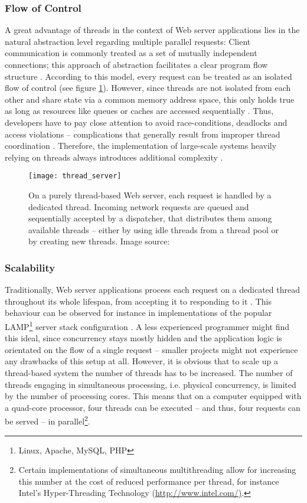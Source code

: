\subsubsection*{Flow of Control}
A great advantage of threads in the context of Web server applications lies in the natural abstraction level regarding multiple parallel requests: Client communication is commonly treated as a set of mutually independent connections; this approach of abstraction facilitates a clear program flow structure \cite{Veal2007}. According to this model, every request can be treated as an isolated flow of control (see figure \ref{fig:thread_server}). However, since threads are not isolated from each other and share state via a common memory address space, this only holds true as long as resources like queues or caches are accessed sequentially \cite[p. 2]{Behren2003}. Thus, developers have to pay close attention to avoid race-conditions, deadlocks and access violations -- complications that generally result from improper thread coordination \cite[p. 1]{Fischer2007}. Therefore, the implementation of large-scale systems heavily relying on threads always introduces additional complexity \cite[p. 1]{Lee2006}.

\begin{figure}
\centering\small
\setlength{\tabcolsep}{0mm}
  \texttt{[image: thread\_server]}
\caption{
On a purely thread-based Web server, each request is handled by a dedicated thread. Incoming network requests are queued and sequentially accepted by a dispatcher, that distributes them among available threads -- either by using idle threads from a thread pool or by creating new threads. Image source: \cite{Welsh2001}
}
\label{fig:thread_server}
\end{figure}

\subsubsection*{Scalability}
Traditionally, Web server applications process each request on a dedicated thread throughout its whole lifespan, from accepting it to responding to it \cite[p. 162]{Henderson2006}. This behaviour can be observed for instance in implementations of the popular LAMP\footnote{Linux, Apache, MySQL, PHP} server stack configuration \cite[p. 48]{Henderson2006}. A less experienced programmer might find this ideal, since concurrency stays mostly hidden and the application logic is orientated on the flow of a single request -- smaller projects might not experience any drawbacks of this setup at all. However, it is obvious that to scale up a thread-based system the number of threads has to be increased. The number of threads engaging in simultaneous processing, i.e. physical concurrency, is limited by the number of processing cores. This means that on a computer equipped with a quad-core processor, four threads can be executed -- and thus, four requests can be served -- in parallel\footnote{\label{lab:hyper}Certain implementations of simultaneous multithreading allow for increasing this number at the cost of reduced performance per thread, for instance Intel's Hyper-Threading Technology (\url{http://www.intel.com/)}.}.

